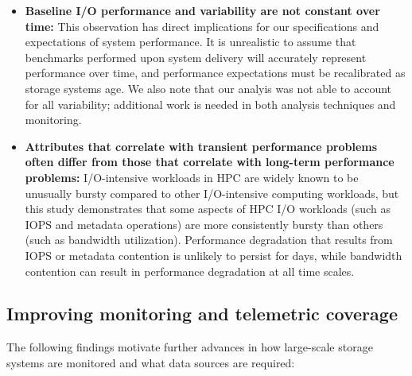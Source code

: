 \begin{itemize}[leftmargin=*]

\item \textbf{Baseline I/O performance and variability are not constant over
time:}
This observation has direct implications for our specifications and expectations of system performance.
It is unrealistic to assume that benchmarks performed upon system delivery
will accurately represent performance over time, and performance
expectations must be recalibrated as storage systems age.  We also note that
our analyis was not able to account for all variability; additional work is
needed in both analysis techniques and monitoring.

\item \textbf{Attributes that correlate with transient performance problems often differ from those that correlate with long-term performance problems:}
I/O-intensive workloads in HPC are widely known to be unusually bursty compared to other I/O-intensive computing workloads, but this study demonstrates that some aspects of HPC I/O workloads (such as IOPS and metadata operations) are more consistently bursty than others (such as bandwidth utilization).
Performance degradation that results from IOPS or metadata contention is unlikely to persist for days, while bandwidth contention can result in performance degradation at all time scales.

\end{itemize}


\subsection{Improving monitoring and telemetric coverage}

The following findings motivate further advances in how large-scale storage systems are monitored and what data sources are required:



